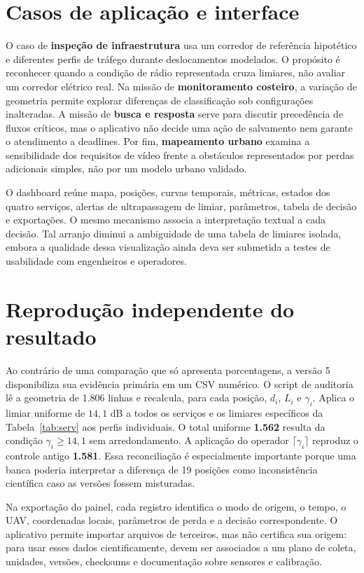\documentclass[10pt,a4paper,twocolumn]{article}
\begin{document}
\section{Casos de aplicação e interface}
O caso de \textbf{inspeção de infraestrutura} usa um corredor de referência hipotético e diferentes perfis de tráfego durante deslocamentos modelados. O propósito é reconhecer quando a condição de rádio representada cruza limiares, não avaliar um corredor elétrico real. Na missão de \textbf{monitoramento costeiro}, a variação de geometria permite explorar diferenças de classificação sob configurações inalteradas. A missão de \textbf{busca e resposta} serve para discutir precedência de fluxos críticos, mas o aplicativo não decide uma ação de salvamento nem garante o atendimento a deadlines. Por fim, \textbf{mapeamento urbano} examina a sensibilidade dos requisitos de vídeo frente a obstáculos representados por perdas adicionais simples, não por um modelo urbano validado.

O dashboard reúne mapa, posições, curvas temporais, métricas, estados dos quatro serviços, alertas de ultrapassagem de limiar, parâmetros, tabela de decisão e exportações. O mesmo mecanismo associa a interpretação textual a cada decisão. Tal arranjo diminui a ambiguidade de uma tabela de limiares isolada, embora a qualidade dessa visualização ainda deva ser submetida a testes de usabilidade com engenheiros e operadores.

\section{Reprodução independente do resultado}
Ao contrário de uma comparação que só apresenta porcentagens, a versão 5 disponibiliza sua evidência primária em um CSV numérico. O script de auditoria lê a geometria de 1.806 linhas e recalcula, para cada posição, $d_i$, $L_i$ e $\gamma_i$. Aplica o limiar uniforme de $14{,}1$ dB a todos os serviços e os limiares específicos da Tabela~\ref{tab:serv} aos perfis individuais. O total uniforme \textbf{1.562} resulta da condição $\gamma_i\geq 14{,}1$ sem arredondamento. A aplicação do operador $\lceil\gamma_i\rceil$ reproduz o controle antigo \textbf{1.581}. Essa reconciliação é especialmente importante porque uma banca poderia interpretar a diferença de 19 posições como inconsistência científica caso as versões fossem misturadas.

Na exportação do painel, cada registro identifica o modo de origem, o tempo, o UAV, coordenadas locais, parâmetros de perda e a decisão correspondente. O aplicativo permite importar arquivos de terceiros, mas não certifica sua origem: para usar esses dados cientificamente, devem ser associados a um plano de coleta, unidades, versões, checksums e documentação sobre sensores e calibração.
\end{document}
